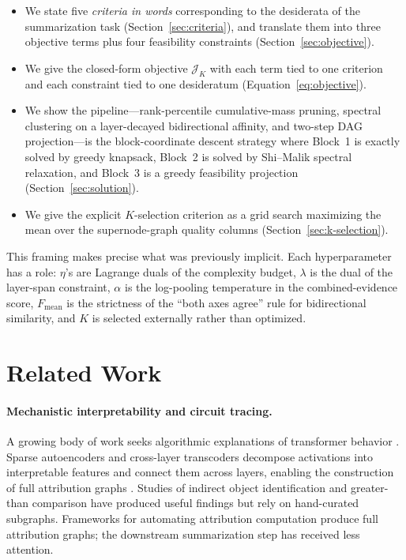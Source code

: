 \documentclass[table, 11pt]{article}
\begin{document}
\begin{itemize}[leftmargin=*,topsep=2pt,itemsep=2pt]
\item We state five \emph{criteria in words} corresponding to the
desiderata of the summarization task (Section~\ref{sec:criteria}),
and translate them into three objective terms plus four feasibility
constraints (Section~\ref{sec:objective}).
\item We give the closed-form objective $\mathcal{J}_K$ with each
term tied to one criterion and each constraint tied to one
desideratum (Equation~\ref{eq:objective}).
\item We show the pipeline---rank-percentile cumulative-mass pruning,
spectral clustering on a layer-decayed bidirectional affinity, and
two-step DAG projection---is the block-coordinate descent strategy
where Block~1 is exactly solved by greedy knapsack, Block~2 is
solved by Shi--Malik spectral relaxation, and Block~3 is a
greedy feasibility projection (Section~\ref{sec:solution}).
\item We give the explicit $K$-selection criterion as a grid search
maximizing the mean over the supernode-graph quality columns
(Section~\ref{sec:k-selection}).
\end{itemize}

This framing makes precise what was previously implicit. Each
hyperparameter has a role: $\eta$'s are Lagrange duals of the
complexity budget, $\lambda$ is the dual of the layer-span
constraint, $\alpha$ is the log-pooling temperature in the
combined-evidence score, $F_{\text{mean}}$ is the strictness of the
``both axes agree'' rule for bidirectional similarity, and $K$ is
selected externally rather than optimized.

\section{Related Work}

\paragraph{Mechanistic interpretability and circuit tracing.}
A growing body of work seeks algorithmic explanations of transformer
behavior \cite{olah2020zoom, elhage2021mathematical}. Sparse
autoencoders \cite{cunningham2023sparse, bricken2023monosemanticity}
and cross-layer transcoders \cite{lindsey2024sparse} decompose
activations into interpretable features and connect them across
layers, enabling the construction of full attribution graphs
\cite{ameisen2024scaling}. Studies of indirect object identification
\cite{wang2022interpretability} and greater-than comparison
\cite{hanna2023does} have produced useful findings but rely on
hand-curated subgraphs. Frameworks for automating attribution
computation \cite{ameisen2024scaling} produce full attribution
graphs; the downstream summarization step has received less attention.
\end{document}
